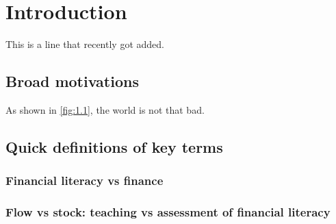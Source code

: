 \documentclass[a4paper,11pt,UKenglish,twoside,openright]{report}\usepackage[]{graphicx}\usepackage[]{color}
\begin{document}

\onehalfspacing

\setcounter{page}{0}

\tableofcontents

\cleardoublepage
\listoftables

\cleardoublepage
\listoffigures

\cleardoublepage
{}








\chapter{Introduction}
\label{chp:1}


This is a line that recently got added.

\section{Broad motivations}

As shown in \cref{fig:1.1}, the world is not that bad.

\section{Quick definitions of key terms}

\subsection{Financial literacy vs finance}

\subsection{Flow vs stock: teaching vs assessment of financial literacy}
\end{document}
